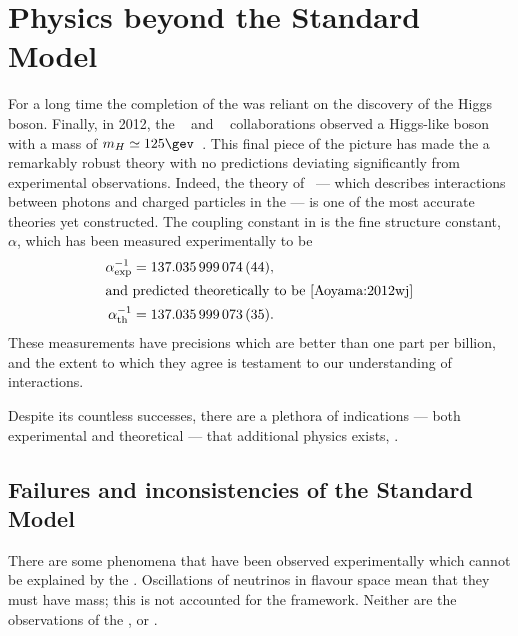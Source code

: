 \section{Physics beyond the Standard Model}
\label{sec:bsm}

For a long time the completion of the \sm was reliant on the discovery of the Higgs boson.
Finally, in 2012, the \cms~\cite{Chatrchyan:2008aa} and \atlas~\cite{Aad:2008zzm} collaborations
observed a Higgs-like boson with a mass of $m_H\simeq125\gev$~\cite{Chatrchyan:2012ufa,Aad:2012tfa}.
This final piece of the picture has made the \sm a remarkably robust theory with no predictions
deviating significantly from experimental observations.
Indeed, the theory of \QED~--- which describes interactions between
photons and charged particles in the \sm --- is one of the most accurate theories yet constructed.
The coupling constant in \QED is the fine structure constant, $\alpha$, which has been measured
experimentally to be~\cite{PDG2012}
\begin{align}
  \alpha^{-1}_\mathrm{exp} &= 137.035\,999\,074\,(44), \nonumber\\
  \intertext{and predicted theoretically to be~\cite{Aoyama:2012wj}}
  \alpha^{-1}_\mathrm{th} &= 137.035\,999\,073\,(35). \nonumber
\end{align}
These measurements have precisions which are better than one part per billion, and the extent to
which they agree is testament to our understanding of \QED interactions.

Despite its countless successes, there are a plethora of indications --- both
experimental and theoretical --- that additional physics exists, \bsm.


\subsection{Failures and inconsistencies of the Standard Model}
\label{sec:bsm:fail}
There are some phenomena that have been observed experimentally which cannot be explained by the
\sm.
Oscillations of neutrinos in flavour space mean that they must have mass; this is not accounted for
the \sm framework.
Neither are the observations of the \BAU, or \dm.

